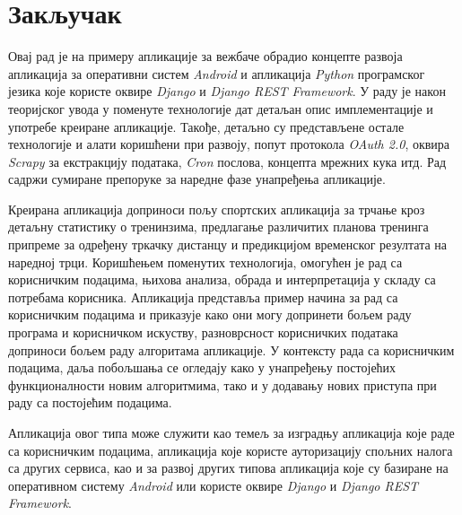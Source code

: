 \documentclass[12pt,oneside]{memoir}
\begin{document}
\chapter{Закључак}\label{chapter:summary}


Овај рад је на примеру апликације за вежбаче обрадио концепте развоја апликација за оперативни систем \textit{Android} и апликација \textit{Python} програмског језика које користе оквире \textit{Django} и \textit{Django REST Framework}. У раду је након теоријског увода у поменуте технологије дат детаљан опис имплементације
и употребе креиране апликације. Такође, детаљно су представљене остале технологије и алати коришћени при развоју, попут протокола \textit{OAuth 2.0}, оквира \textit{Scrapy} за екстракцију података, \textit{Cron} послова, концепта мрежних кука итд. Рад садржи сумиране препоруке за наредне фазе унапређења апликације.

Креирана апликација доприноси пољу спортских апликација за трчање кроз детаљну статистику о тренинзима, предлагање различитих планова тренинга припреме за одређену тркачку дистанцу и предикцијом временског резултата на наредној трци. Коришћењем поменутих технологија, омогућен је рад са корисничким подацима, њихова анализа, обрада и интерпретација у складу са потребама корисника. Апликација представља пример начина за рад са корисничким подацима и приказује како они могу допринети бољем раду програма и корисничком искуству, разноврсност корисничких података доприноси бољем раду алгоритама апликације. У контексту рада са корисничким подацима, даља побољшања се огледају како у унапређењу постојећих функционалности новим алгоритмима, тако и у додавању нових приступа при раду са постојећим подацима.

Апликација овог типа може служити као темељ за изградњу апликација које раде са корисничким подацима, апликација које користе ауторизацију спољних налога са других сервиса, као и за развој других типова апликација које су базиране на оперативном систему \textit{Android} или користе оквире \textit{Django} и \textit{Django REST Framework}.




\literatura

\backmatter

\begin{biografija}

\end{biografija}
\end{document}

